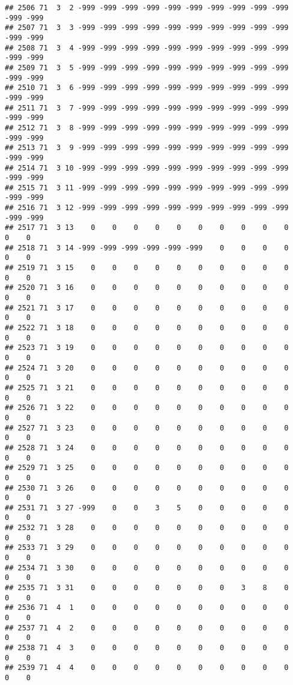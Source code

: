 \documentclass[]{article}
\begin{document}
\begin{verbatim}
## 2506 71  3  2 -999 -999 -999 -999 -999 -999 -999 -999 -999 -999 -999 -999
## 2507 71  3  3 -999 -999 -999 -999 -999 -999 -999 -999 -999 -999 -999 -999
## 2508 71  3  4 -999 -999 -999 -999 -999 -999 -999 -999 -999 -999 -999 -999
## 2509 71  3  5 -999 -999 -999 -999 -999 -999 -999 -999 -999 -999 -999 -999
## 2510 71  3  6 -999 -999 -999 -999 -999 -999 -999 -999 -999 -999 -999 -999
## 2511 71  3  7 -999 -999 -999 -999 -999 -999 -999 -999 -999 -999 -999 -999
## 2512 71  3  8 -999 -999 -999 -999 -999 -999 -999 -999 -999 -999 -999 -999
## 2513 71  3  9 -999 -999 -999 -999 -999 -999 -999 -999 -999 -999 -999 -999
## 2514 71  3 10 -999 -999 -999 -999 -999 -999 -999 -999 -999 -999 -999 -999
## 2515 71  3 11 -999 -999 -999 -999 -999 -999 -999 -999 -999 -999 -999 -999
## 2516 71  3 12 -999 -999 -999 -999 -999 -999 -999 -999 -999 -999 -999 -999
## 2517 71  3 13    0    0    0    0    0    0    0    0    0    0    0    0
## 2518 71  3 14 -999 -999 -999 -999 -999 -999    0    0    0    0    0    0
## 2519 71  3 15    0    0    0    0    0    0    0    0    0    0    0    0
## 2520 71  3 16    0    0    0    0    0    0    0    0    0    0    0    0
## 2521 71  3 17    0    0    0    0    0    0    0    0    0    0    0    0
## 2522 71  3 18    0    0    0    0    0    0    0    0    0    0    0    0
## 2523 71  3 19    0    0    0    0    0    0    0    0    0    0    0    0
## 2524 71  3 20    0    0    0    0    0    0    0    0    0    0    0    0
## 2525 71  3 21    0    0    0    0    0    0    0    0    0    0    0    0
## 2526 71  3 22    0    0    0    0    0    0    0    0    0    0    0    0
## 2527 71  3 23    0    0    0    0    0    0    0    0    0    0    0    0
## 2528 71  3 24    0    0    0    0    0    0    0    0    0    0    0    0
## 2529 71  3 25    0    0    0    0    0    0    0    0    0    0    0    0
## 2530 71  3 26    0    0    0    0    0    0    0    0    0    0    0    0
## 2531 71  3 27 -999    0    0    3    5    0    0    0    0    0    0    0
## 2532 71  3 28    0    0    0    0    0    0    0    0    0    0    0    0
## 2533 71  3 29    0    0    0    0    0    0    0    0    0    0    0    0
## 2534 71  3 30    0    0    0    0    0    0    0    0    0    0    0    0
## 2535 71  3 31    0    0    0    0    0    0    0    3    8    0    0    0
## 2536 71  4  1    0    0    0    0    0    0    0    0    0    0    0    0
## 2537 71  4  2    0    0    0    0    0    0    0    0    0    0    0    0
## 2538 71  4  3    0    0    0    0    0    0    0    0    0    0    0    0
## 2539 71  4  4    0    0    0    0    0    0    0    0    0    0    0    0

\end{verbatim}
\end{document}
